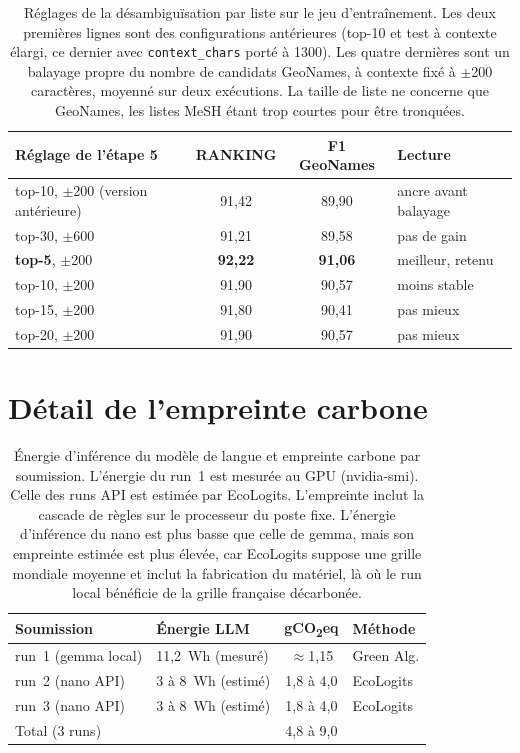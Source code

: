 \documentclass[10pt,twoside]{article}
\begin{document}
\begin{table}[H]
\centering
\small
\setlength{\tabcolsep}{4pt}
\begin{tabular}{lccp{3.5cm}}
\toprule
Réglage de l'étape 5 & RANKING & F1 GeoNames & Lecture \\
\midrule
top-10, $\pm$200 (version antérieure) & 91,42 & 89,90 & ancre avant balayage \\
top-30, $\pm$600 & 91,21 & 89,58 & pas de gain \\
\midrule
\textbf{top-5}, $\pm$200 & \textbf{92,22} & \textbf{91,06} & meilleur, retenu \\
top-10, $\pm$200 & 91,90 & 90,57 & moins stable \\
top-15, $\pm$200 & 91,80 & 90,41 & pas mieux \\
top-20, $\pm$200 & 91,90 & 90,57 & pas mieux \\
\bottomrule
\end{tabular}
\caption{Réglages de la désambiguïsation par liste sur le jeu d'entraînement. Les deux premières lignes
sont des configurations antérieures (top-10 et test à contexte élargi, ce dernier avec
\texttt{context\_chars} porté à 1300). Les quatre dernières sont un
balayage propre du nombre de candidats GeoNames, à contexte fixé à $\pm$200 caractères, moyenné
sur deux exécutions. La taille de liste ne concerne que GeoNames, les listes MeSH étant trop
courtes pour être tronquées.}
\label{tab:listwise}
\end{table}

\section{Détail de l'empreinte carbone}
\label{ann:carbone}

\begin{table}[H]
\centering
\small
\setlength{\tabcolsep}{5pt}
\begin{tabular}{llcl}
\toprule
Soumission & Énergie LLM & gCO\textsubscript{2}eq & Méthode \\
\midrule
run~1 (gemma local) & 11,2~Wh (mesuré) & $\approx$1,15 & Green Alg. \\
run~2 (nano API) & 3 à 8~Wh (estimé) & 1,8 à 4,0 & EcoLogits \\
run~3 (nano API) & 3 à 8~Wh (estimé) & 1,8 à 4,0 & EcoLogits \\
\midrule
Total (3 runs) & & 4,8 à 9,0 & \\
\bottomrule
\end{tabular}
\caption{Énergie d'inférence du modèle de langue et empreinte carbone par soumission. L'énergie du
run~1 est mesurée au GPU (nvidia-smi). Celle des runs API est estimée par EcoLogits. L'empreinte
inclut la cascade de règles sur le processeur du poste fixe. L'énergie d'inférence du nano est plus
basse que celle de gemma, mais son empreinte estimée est plus élevée, car EcoLogits suppose une
grille mondiale moyenne et inclut la fabrication du matériel, là où le run local bénéficie de la
grille française décarbonée.}
\label{tab:carbone}
\end{table}
\end{document}
